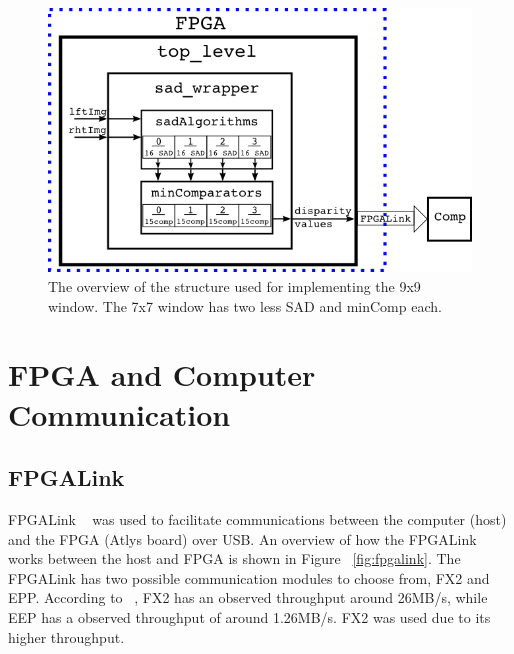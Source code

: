 \begin{figure}[h]
	\begin{center}
		\includegraphics[width=150mm]{figures/top_level_rtl.png}
		\captionfonts
		\caption{The overview of the structure used for implementing the 9x9 window. The 7x7 window has two less SAD and minComp each.}
		\label{fig:topLevel_rtl}
	\end{center}
\end{figure}


\section{FPGA and Computer Communication}

\subsection{FPGALink}
\label{sec:fpgalink}

FPGALink ~\cite{fpgalink} was used to facilitate communications between the computer (host) and the FPGA (Atlys board) over USB. An overview of how the FPGALink works between the host and FPGA is shown in Figure ~\ref{fig:fpgalink}. The FPGALink has two possible communication modules to choose from, FX2 and EPP. According to ~\cite{fpgalink}, FX2 has an observed throughput around 26MB/s, while EEP has a observed throughput of around 1.26MB/s. FX2 was used due to its higher throughput.

